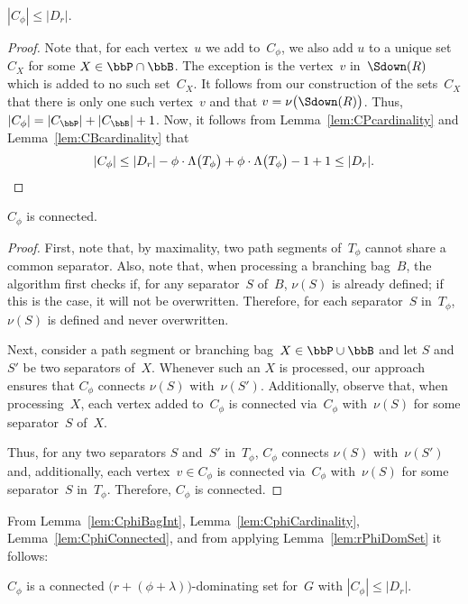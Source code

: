 \begin{lemma}
    \label{lem:CphiCardinality}
\( |C_\phi| \leq |D_r| \).
\end{lemma}

\begin{proof}
Note that, for each vertex~$u$ we add to~$C_\phi$, we also add $u$ to a unique set~$C_X$ for some $X \in \bbP \cap \bbB$.
The exception is the vertex~$v$ in~$\Sdown(R)$ which is added to no such set~$C_X$.
It follows from our construction of the sets~$C_X$ that there is only one such vertex~$v$ and that $v = \nu \big( \Sdown(R) \big)$.
Thus, $|C_\phi| = |C_\bbP| + |C_\bbB| + 1$.
Now, it follows from Lemma~\ref{lem:CPcardinality} and Lemma~\ref{lem:CBcardinality} that
\[
    |C_\phi| \leq |D_r| - \phi \cdot \Lambda \big( T_\phi \big) + \phi \cdot \Lambda \big( T_\phi \big) - 1 + 1 \leq |D_r|.
    \qedhere
\]
\end{proof}

\begin{lemma}
    \label{lem:CphiConnected}
\( C_\phi \) is connected.
\end{lemma}

\begin{proof}
First, note that, by maximality, two path segments of~$T_\phi$ cannot share a common separator.
Also, note that, when processing a branching bag~$B$, the algorithm first checks if, for any separator~$S$ of~$B$, $\nu(S)$ is already defined; if this is the case, it will not be overwritten.
Therefore, for each separator~$S$ in~$T_\phi$, $\nu(S)$ is defined and never overwritten.

Next, consider a path segment or branching bag~$X \in \bbP \cup \bbB$ and let $S$ and~$S'$ be two separators of~$X$.
Whenever such an $X$ is processed, our approach ensures that $C_\phi$ connects $\nu(S)$ with~$\nu(S')$.
Additionally, observe that, when processing~$X$, each vertex added to~$C_\phi$ is connected via~$C_\phi$ with~$\nu(S)$ for some separator~$S$ of~$X$.

Thus, for any two separators $S$ and~$S'$ in~$T_\phi$, $C_\phi$ connects $\nu(S)$ with~$\nu(S')$ and, additionally, each vertex~$v \in C_\phi$ is connected via~$C_\phi$ with~$\nu(S)$ for some separator~$S$ in~$T_\phi$.
Therefore, $C_\phi$ is connected.
\end{proof}

From Lemma~\ref{lem:CphiBagInt}, Lemma~\ref{lem:CphiCardinality}, Lemma~\ref{lem:CphiConnected}, and from applying Lemma~\ref{lem:rPhiDomSet} it follows:

\begin{corollary}
    \label{cor:CphiConDomSet}
\( C_\phi \) is a connected \( \big( r + (\phi + \lambda) \big) \)-dominating set for~\( G \) with \( |C_\phi| \leq |D_r| \).
\end{corollary}


